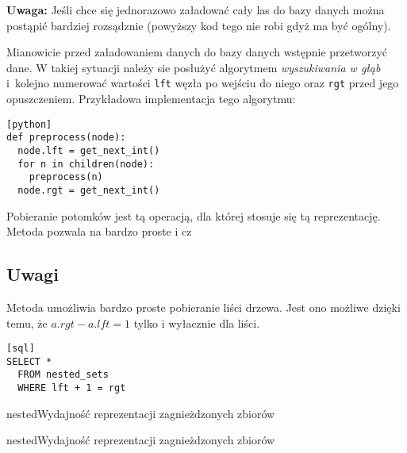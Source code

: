 
\textbf{Uwaga:} Jeśli chce się jednorazowo załadować cały las do bazy danych można postąpić bardziej rozsądznie
(powyższy kod tego nie robi gdyż ma być ogólny).

Mianowicie przed załadowaniem danych do bazy danych wstępnie przetworzyć dane.
W takiej sytuacji należy sie posłużyć algorytmem \emph{wyszukiwania w głąb}
i~kolejno numerować wartości \texttt{lft} węzła po wejściu do niego oraz \texttt{rgt} przed jego opuszczeniem.
Przykładowa implementacja tego algorytmu:

\begin{verbatim}[python]
def preprocess(node):
  node.lft = get_next_int()
  for n in children(node):
    preprocess(n)
  node.rgt = get_next_int()
\end{verbatim}






Pobieranie potomków jest tą operacją, dla której stosuje się tą reprezentację.
Metoda pozwala na bardzo proste i cz




\subsection{Uwagi}

Metoda umożliwia bardzo proste pobieranie liści drzewa.
Jest ono możliwe dzięki temu, że $a.rgt - a.lft = 1$ tylko i wyłacznie dla liści. 
\begin{verbatim}[sql]
SELECT *
  FROM nested_sets
  WHERE lft + 1 = rgt
\end{verbatim}



\begin{qxtab}{nested}{Wydajność reprezentacji zagnieżdzonych zbiorów}
\end{qxtab}

\begin{qxfig}{nested}{Wydajność reprezentacji zagnieżdzonych zbiorów}
\end{qxfig}

